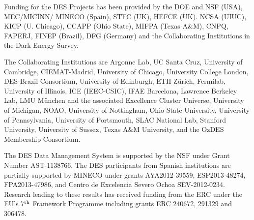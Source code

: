 Funding for the DES Projects has been provided by the DOE and NSF (USA), 
MEC/MICINN/ MINECO (Spain), STFC (UK), HEFCE (UK). NCSA (UIUC), 
KICP (U. Chicago), CCAPP (Ohio State), MIFPA (Texas A\&M), CNPQ, FAPERJ, 
FINEP (Brazil), DFG (Germany) and the Collaborating Institutions in the Dark Energy Survey.

The Collaborating Institutions are Argonne Lab, UC Santa Cruz, 
University of Cambridge, CIEMAT-Madrid, University of Chicago, University College London, 
DES-Brazil Consortium, University of Edinburgh, ETH Z{\"u}rich, Fermilab, 
University of Illinois, ICE (IEEC-CSIC), IFAE Barcelona, Lawrence Berkeley Lab, 
LMU M{\"u}nchen and the associated Excellence Cluster Universe, 
University of Michigan, NOAO, University of Nottingham, Ohio State University, University of 
Pennsylvania, University of Portsmouth, SLAC National Lab, Stanford University, 
University of Sussex, Texas A\&M University, and the OzDES Membership Consortium.

The DES Data Management System is supported by the NSF under 
Grant Number AST-1138766. The DES participants from Spanish institutions are partially 
supported by MINECO under grants AYA2012-39559, ESP2013-48274, FPA2013-47986, 
and Centro de Excelencia Severo Ochoa SEV-2012-0234. Research leading 
to these results has received funding from the ERC under the EU's 7$^{\rm th}$ 
Framework Programme including grants ERC 240672, 291329 and 306478.

